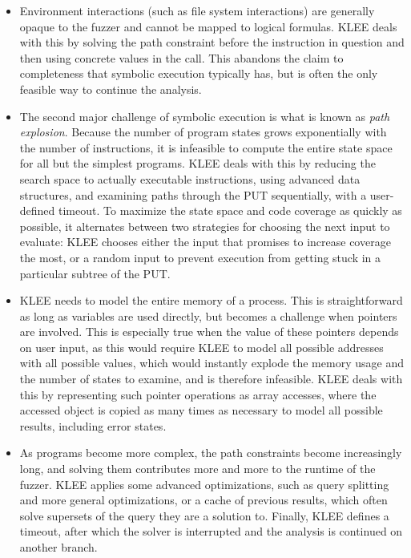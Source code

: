 \documentclass{article}
\begin{document}
\begin{itemize}
    \item Environment interactions (such as file system interactions) are generally opaque to the fuzzer and cannot be mapped to logical formulas. KLEE deals with this by solving the path constraint before the instruction in question and then using concrete values in the call. This abandons the claim to completeness that symbolic execution typically has, but is often the only feasible way to continue the analysis.
    \item The second major challenge of symbolic execution is what is known as \textit{path explosion}. Because the number of program states grows exponentially with the number of instructions, it is infeasible to compute the entire state space for all but the simplest programs. KLEE deals with this by reducing the search space to actually executable instructions, using advanced data structures, and examining paths through the PUT sequentially, with a user-defined timeout. To maximize the state space and code coverage as quickly as possible, it alternates between two strategies for choosing the next input to evaluate: KLEE chooses either the input that promises to increase coverage the most, or a random input to prevent execution from getting stuck in a particular subtree of the PUT.
    \item KLEE needs to model the entire memory of a process. This is straightforward as long as variables are used directly, but becomes a challenge when pointers are involved. This is especially true when the value of these pointers depends on user input, as this would require KLEE to model all possible addresses with all possible values, which would instantly explode the memory usage and the number of states to examine, and is therefore infeasible. KLEE deals with this by representing such pointer operations as array accesses, where the accessed object is copied as many times as necessary to model all possible results, including error states.
    \item As programs become more complex, the path constraints become increasingly long, and solving them contributes more and more to the runtime of the fuzzer. KLEE applies some advanced optimizations, such as query splitting and more general optimizations, or a cache of previous results, which often solve supersets of the query they are a solution to. Finally, KLEE defines a timeout, after which the solver is interrupted and the analysis is continued on another branch.
\end{itemize}
\end{document}
